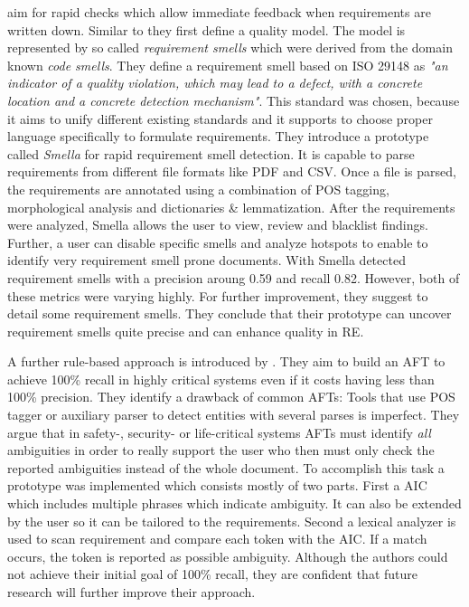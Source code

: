 \textcite{Femmer:2017} aim for rapid checks which allow immediate feedback when requirements are written down.
Similar to \textcite{Fabbrini:2002} they first define a quality model.
The model is represented by so called \textit{requirement smells} which were derived from the domain known \textit{code smells}.
They define a requirement smell based on ISO 29148 as \textit{"an indicator of a quality violation, which may lead to a defect, with a concrete location and a concrete detection mechanism"}.
This standard was chosen, because it aims to unify different existing standards and it supports to choose proper language specifically to formulate requirements.
They introduce a prototype called \textit{Smella} for rapid requirement smell detection.
It is capable to parse requirements from different file formats like \ac{PDF} and \ac{CSV}.
Once a file is parsed, the requirements are annotated using a combination of \ac{POS} tagging, morphological analysis and dictionaries \& lemmatization.
After the requirements were analyzed, Smella allows the user to view, review and blacklist findings.
Further, a user can disable specific smells and analyze hotspots to enable to identify very requirement smell prone documents.
With Smella \textcite{Femmer:2017} detected requirement smells with a precision aroung 0.59 and recall 0.82.
However, both of these metrics were varying highly.
For further improvement, they suggest to detail some requirement smells.
They conclude that their prototype can uncover requirement smells quite precise and can enhance quality in \ac{RE}.

A further rule-based approach is introduced by \textcite{Tjong:2013}.
They aim to build an \ac{AFT} to achieve 100\% recall in highly critical systems even if it costs having less than 100\% precision.
They identify a drawback of common \acp{AFT}:
Tools that use \ac{POS} tagger or auxiliary parser to detect entities with several parses is imperfect.
They argue that in safety-, security- or life-critical systems \acp{AFT} must identify \textit{all} ambiguities in order to really support the user who then must only check the reported ambiguities instead of the whole document.
To accomplish this task a prototype was implemented which consists mostly of two parts.
First a \ac{AIC} which includes multiple phrases which indicate ambiguity.
It can also be extended by the user so it can be tailored to the requirements.
Second a lexical analyzer is used to scan requirement and compare each token with the \ac{AIC}.
If a match occurs, the token is reported as possible ambiguity.
Although the authors could not achieve their initial goal of 100\% recall, they are confident that future research will further improve their approach.
